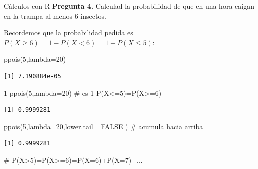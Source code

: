 \documentclass[
  ignorenonframetext,
  aspectratio=169]{beamer}
\newenvironment{Shaded}{\begin{snugshade}}{\end{snugshade}}
\newcommand{\AttributeTok}[1]{\textcolor[rgb]{0.40,0.45,0.13}{#1}}
\newcommand{\CommentTok}[1]{\textcolor[rgb]{0.37,0.37,0.37}{#1}}
\newcommand{\ConstantTok}[1]{\textcolor[rgb]{0.56,0.35,0.01}{#1}}
\newcommand{\DecValTok}[1]{\textcolor[rgb]{0.68,0.00,0.00}{#1}}
\newcommand{\FunctionTok}[1]{\textcolor[rgb]{0.28,0.35,0.67}{#1}}
\newcommand{\NormalTok}[1]{\textcolor[rgb]{0.00,0.23,0.31}{#1}}
\newcommand{\SpecialCharTok}[1]{\textcolor[rgb]{0.37,0.37,0.37}{#1}}
\begin{document}
\begin{frame}[fragile]{Cálculos con R}
\protect\hypertarget{cuxe1lculos-con-r-8}{}
\textbf{Pregunta 4.} Calculad la probabilidad de que en una hora caigan
en la trampa al menos 6 insectos.

Recordemos que la probabilidad pedida es
\(P(X\geq 6)=1-P(X<6)=1-P(X\leq 5)\):

\begin{Shaded}
\begin{Highlighting}[]
\FunctionTok{ppois}\NormalTok{(}\DecValTok{5}\NormalTok{,}\AttributeTok{lambda=}\DecValTok{20}\NormalTok{)}
\end{Highlighting}
\end{Shaded}

\begin{verbatim}
[1] 7.190884e-05
\end{verbatim}

\begin{Shaded}
\begin{Highlighting}[]
\DecValTok{1}\SpecialCharTok{{-}}\FunctionTok{ppois}\NormalTok{(}\DecValTok{5}\NormalTok{,}\AttributeTok{lambda=}\DecValTok{20}\NormalTok{) }\CommentTok{\# es 1{-}P(X\textless{}=5)=P(X\textgreater{}=6)}
\end{Highlighting}
\end{Shaded}

\begin{verbatim}
[1] 0.9999281
\end{verbatim}

\begin{Shaded}
\begin{Highlighting}[]
\FunctionTok{ppois}\NormalTok{(}\DecValTok{5}\NormalTok{,}\AttributeTok{lambda=}\DecValTok{20}\NormalTok{,}\AttributeTok{lower.tail =}\ConstantTok{FALSE}\NormalTok{ ) }\CommentTok{\# acumula hacia arriba }
\end{Highlighting}
\end{Shaded}

\begin{verbatim}
[1] 0.9999281
\end{verbatim}

\begin{Shaded}
\begin{Highlighting}[]
\CommentTok{\# P(X\textgreater{}5)=P(X\textgreater{}=6)=P(X=6)+P(X=7)+...}
\end{Highlighting}
\end{Shaded}
\end{frame}
\end{document}
